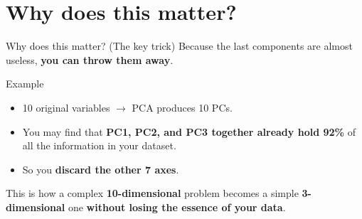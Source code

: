 \documentclass[aspectratio=43,11pt]{beamer}
\begin{document}
\section{Why does this matter?}

\begin{frame}{Why does this matter? (The key trick)}
Because the last components are almost useless,
\textbf{you can throw them away}.

\vspace{0.5em}
\begin{exampleblock}{Example}
\begin{itemize}
  \item 10 original variables $\rightarrow$ PCA produces 10 PCs.
  \item You may find that \textbf{PC1, PC2, and PC3 together already hold 92\%}
        of all the information in your dataset.
  \item So you \textbf{discard the other 7 axes}.
\end{itemize}
\end{exampleblock}

\vspace{0.5em}
This is how a complex \textbf{10-dimensional} problem becomes a simple
\textbf{3-dimensional} one \textbf{without losing the essence of your data}.
\end{frame}
\end{document}
